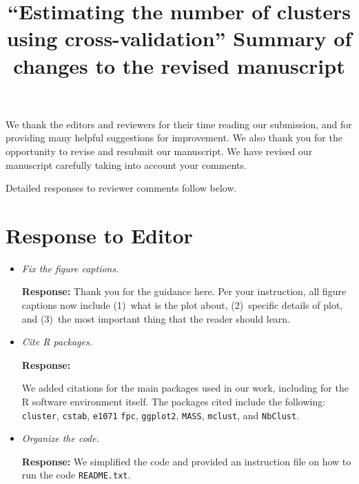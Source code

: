 \documentclass[11pt]{article}
\title{``Estimating the number of clusters using cross-validation''
Summary of changes to the revised manuscript}
\begin{document}
\maketitle
\setlength{\parindent}{0ex}
\setlength{\parskip}{1ex}
\vspace{2ex}

We thank the editors and reviewers for their time reading our submission, and
for providing many helpful suggestions for improvement.  We also thank you for
the opportunity to revise and resubmit our manuscript.  We have revised our
manuscript carefully taking into account your comments.

Detailed responses to reviewer comments follow below.


\section*{Response to Editor}

\begin{itemize}

\item \textit{Fix the figure captions.}

\textbf{Response:} Thank you for the guidance here. Per your instruction, all
figure captions now include (1)~what is the plot about, (2)~specific details
of plot, and (3)~the most important thing that the reader should learn.


\item \textit{Cite R packages.}

\textbf{Response:} 

We added citations for the main packages used in our work, including for the R
software environment itself. The packages cited include the following:
\texttt{cluster},
\texttt{cstab},
\texttt{e1071}
\texttt{fpc},
\texttt{ggplot2},
\texttt{MASS},
\texttt{mclust},
and
\texttt{NbClust}.




\item \textit{Organize the code.}

\textbf{Response:} We simplified the code and provided an instruction file
on how to run the code \texttt{README.txt}.



\end{itemize}
\end{document}

